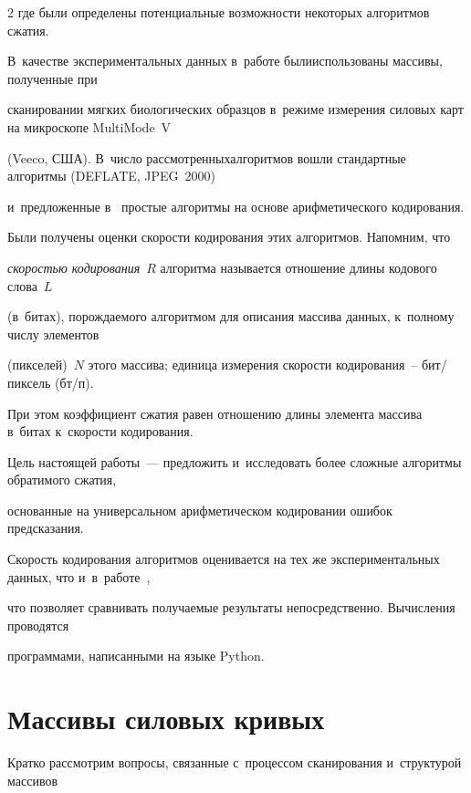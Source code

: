 \begin{multicols}{2}
где были определены потенциальные возможности некоторых алгоритмов сжатия. 

В~качестве экспериментальных данных в~работе были\linebreak использованы массивы, полученные при 

сканировании мягких биологических образцов в~режиме измерения силовых карт на микроскопе MultiMode~V 

(Veeco, США). В~число рассмотренных\linebreak алгоритмов вошли стандартные алгоритмы (\mbox{DEFLATE}, JPEG~2000) 

и~предложенные в~\cite{b1} простые алгоритмы на основе арифметического кодирования. 

Были получены оценки скорости кодирования этих алгоритмов. Напомним, что 

\textit{ско\-ростью кодирования}~$R$ алгоритма называется отношение длины кодового слова~$L$ 

(в~битах), порождаемого алгоритмом для описания массива данных, к~полному числу элементов 

(пикселей)~$N$ этого массива; единица измерения скорости кодирования~-- бит/пик\-сель (бт/п). 

При этом коэффициент сжатия равен отношению длины элемента массива в~битах к~ско\-рости кодирования.



Цель настоящей работы~--- предложить и~исследовать более сложные алгоритмы обратимого сжатия, 

основанные на универсальном арифметическом кодировании ошибок предсказания. 

Скорость кодирования алгоритмов оценивается на тех же экспериментальных данных, что и~в~работе~\cite{b1}, 

что позволяет сравнивать получаемые результаты непосредственно. Вычисления проводятся 

программами, написанными на языке Python.

{



}



\section{Массивы силовых кривых}




Кратко рассмотрим вопросы, связанные с~процессом сканирования и~структурой массивов 


\end{multicols}
